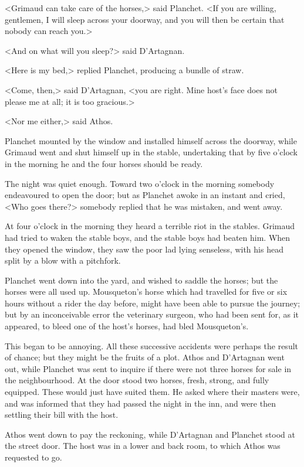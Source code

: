 <Grimaud can take care of the horses,> said Planchet. <If you are willing, gentlemen, I will sleep across your doorway, and you will then be certain that nobody can reach you.> 

<And on what will you sleep?> said D'Artagnan. 

<Here is my bed,> replied Planchet, producing a bundle of straw. 

<Come, then,> said D'Artagnan, <you are right. Mine host's face does not please me at all; it is too gracious.> 

<Nor me either,> said Athos. 

Planchet mounted by the window and installed himself across the doorway, while Grimaud went and shut himself up in the stable, undertaking that by five o'clock in the morning he and the four horses should be ready. 

The night was quiet enough. Toward two o'clock in the morning somebody endeavoured to open the door; but as Planchet awoke in an instant and cried, <Who goes there?> somebody replied that he was mistaken, and went away. 

At four o'clock in the morning they heard a terrible riot in the stables. Grimaud had tried to waken the stable boys, and the stable boys had beaten him. When they opened the window, they saw the poor lad lying senseless, with his head split by a blow with a pitchfork. 

Planchet went down into the yard, and wished to saddle the horses; but the horses were all used up. Mousqueton's horse which had travelled for five or six hours without a rider the day before, might have been able to pursue the journey; but by an inconceivable error the veterinary surgeon, who had been sent for, as it appeared, to bleed one of the host's horses, had bled Mousqueton's. 

This began to be annoying. All these successive accidents were perhaps the result of chance; but they might be the fruits of a plot. Athos and D'Artagnan went out, while Planchet was sent to inquire if there were not three horses for sale in the neighbourhood. At the door stood two horses, fresh, strong, and fully equipped. These would just have suited them. He asked where their masters were, and was informed that they had passed the night in the inn, and were then settling their bill with the host. 

Athos went down to pay the reckoning, while D'Artagnan and Planchet stood at the street door. The host was in a lower and back room, to which Athos was requested to go. 

